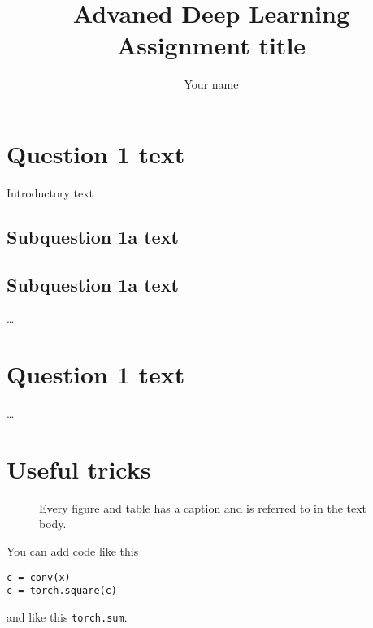 \documentclass[12pt,a4paper]{article}
\begin{document}
\title{Advaned Deep Learning\\Assignment title}
\author{\color{red}Your name}
\maketitle

\section{Question 1 text}

Introductory text
\subsection{Subquestion 1a text}
\subsection{Subquestion 1a text}
\ldots
\section{Question 1 text}
\ldots

\appendix
\section{Useful tricks}
\begin{figure}
  \begin{center}
  \end{center}
  \caption{Every figure and table has a caption and is referred to 
    in the text body.\label{fig:q6p1}}
\end{figure}

You can add code like this
\begin{lstlisting}
c = conv(x)
c = torch.square(c)
\end{lstlisting}
and like this \lstinline{torch.sum}.
\end{document}
